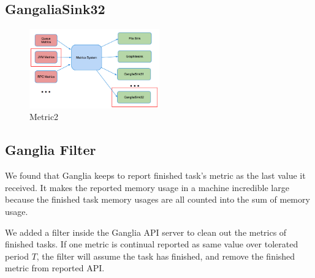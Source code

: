 \subsection{GangaliaSink32}

\begin{figure}[h!]
  \caption{Metric2}
  \centering
    \includegraphics[width=0.5\textwidth]{image/ganglia32}
\end{figure}

\subsection{Ganglia Filter}

We found that Ganglia keeps to report finished task's metric as the last value it received. It makes the reported memory usage in a machine incredible large because the finished task memory usages are all counted into the sum of memory usage.

We added a filter inside the Ganglia API server to clean out the metrics of finished tasks. If one metric is continual reported as same value over tolerated period $T$, the filter will assume the task has finished, and remove the finished metric from reported API. 

